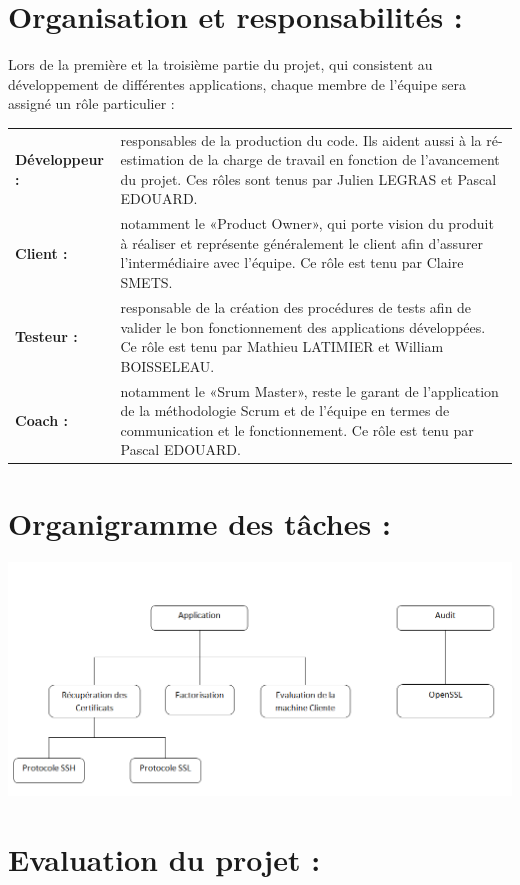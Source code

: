 \documentclass[a4paper,11pt,french]{article}
\begin{document}
\section{Organisation et responsabilités :}

Lors de la première et la troisième partie du projet, qui consistent au développement de différentes applications, chaque membre de l'équipe sera assigné un rôle particulier :\\

\begin{tabular}{l p{15cm}}
\textbf{Développeur :} & responsables de la production du code. Ils aident aussi à la ré-estimation de la charge de travail en fonction de l'avancement du projet. Ces rôles sont tenus par Julien LEGRAS et Pascal EDOUARD. \\
\textbf{Client :}& notamment le «Product Owner», qui porte vision du produit à réaliser et représente généralement le client afin d'assurer l'intermédiaire avec l'équipe. Ce rôle est tenu par Claire SMETS.\\
\textbf{Testeur :}&  responsable de la création des procédures de tests afin de valider le bon fonctionnement des applications développées. Ce rôle est tenu par Mathieu LATIMIER et William BOISSELEAU.\\
\textbf{Coach :}&  notamment le «Srum Master», reste le garant de l'application de la méthodologie Scrum et de l'équipe en termes de communication et le fonctionnement. Ce rôle est tenu par Pascal EDOUARD.
\end{tabular}

\newpage

\section{Organigramme des tâches :}
\includegraphics[width=45em]{organigramme.png}

\section{Evaluation du projet :}
\end{document}
